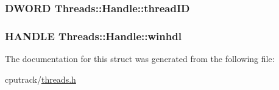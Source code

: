 \subsubsection[{\texorpdfstring{thread\+ID}{threadID}}]{\setlength{\rightskip}{0pt plus 5cm}D\+W\+O\+RD Threads\+::\+Handle\+::thread\+ID}\hypertarget{struct_threads_1_1_handle_a5e2757013c0abb756250e817a4e69317}{}\label{struct_threads_1_1_handle_a5e2757013c0abb756250e817a4e69317}
\subsubsection[{\texorpdfstring{winhdl}{winhdl}}]{\setlength{\rightskip}{0pt plus 5cm}H\+A\+N\+D\+LE Threads\+::\+Handle\+::winhdl}\hypertarget{struct_threads_1_1_handle_ae96b38f14dd31c440d926bd664e3e950}{}\label{struct_threads_1_1_handle_ae96b38f14dd31c440d926bd664e3e950}


The documentation for this struct was generated from the following file\+:\begin{DoxyCompactItemize}
\item 
cputrack/\hyperlink{threads_8h}{threads.\+h}\end{DoxyCompactItemize}
